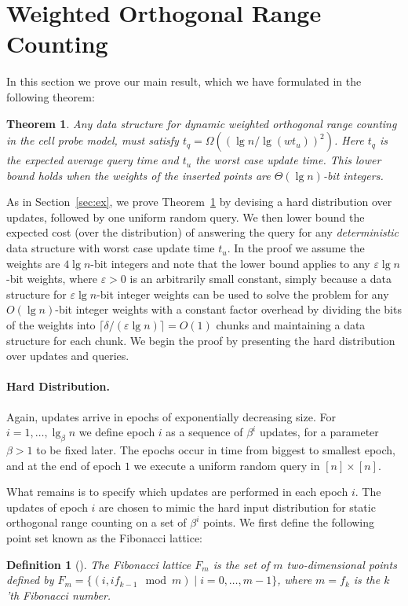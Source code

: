 \documentclass[letterpaper]{article}
\newtheorem{theorem}{Theorem}
\newtheorem{definition}{Definition}
\newcommand{\eps}{\varepsilon}
\begin{document}
\section{Weighted Orthogonal Range Counting}
\label{sec:dyn}
In this section we prove our main result, which we have formulated in
the following theorem:
\begin{theorem}
\label{thm:main}
Any data structure for dynamic weighted orthogonal range counting in
the cell probe model, must satisfy $t_q = \Omega((\lg n/\lg(w
t_u))^2)$. Here $t_q$ is the expected average query time and $t_u$ the
worst case update time. This lower bound holds when the weights of the
inserted points are $\Theta(\lg n)$-bit integers.
\end{theorem}
As in Section~\ref{sec:ex}, we prove Theorem~\ref{thm:main} by
devising a hard distribution over updates, followed by one uniform
random query. We then lower bound the expected cost (over the
distribution) of answering the query for any \emph{deterministic} data
structure with worst case update time $t_u$. In the proof we assume
the weights are $4 \lg n$-bit integers and note that the lower bound
applies to any $\eps \lg n$-bit weights, where $\eps > 0$ is an
arbitrarily small constant, simply because a data structure for $\eps
\lg n$-bit integer weights can be used to solve the problem for any
$O(\lg n)$-bit integer weights with a constant factor overhead by
dividing the bits of the weights into $\lceil \delta/(\eps \lg n)
\rceil = O(1)$ chunks and maintaining a data structure for each
chunk. We begin the proof by presenting the hard distribution over
updates and queries.


\paragraph{Hard Distribution.}
Again, updates arrive in epochs of exponentially decreasing
size. For $i=1,\dots,\lg_\beta n$ we define epoch $i$ as a sequence of
$\beta^i$ updates, for a parameter $\beta>1$ to be fixed later. The
epochs occur in time from biggest to smallest epoch, and at the end of
epoch $1$ we execute a uniform random query in $[n] \times [n]$.

What remains is to specify which updates are performed in each epoch
$i$. The updates of epoch $i$ are chosen to mimic the hard input
distribution for static orthogonal range counting on a set of
$\beta^i$ points.  We first define the following point set known as
the Fibonacci lattice:

\begin{definition}[\cite{matousek:discrepency}]
The Fibonacci lattice $F_m$ is the set of $m$ two-dimensional points
defined by $F_m=\{(i,if_{k-1} \mod m) \mid i=0,\dots,m-1\}$, where
$m=f_k$ is the $k$'th Fibonacci number.
\end{definition}
\end{document}
